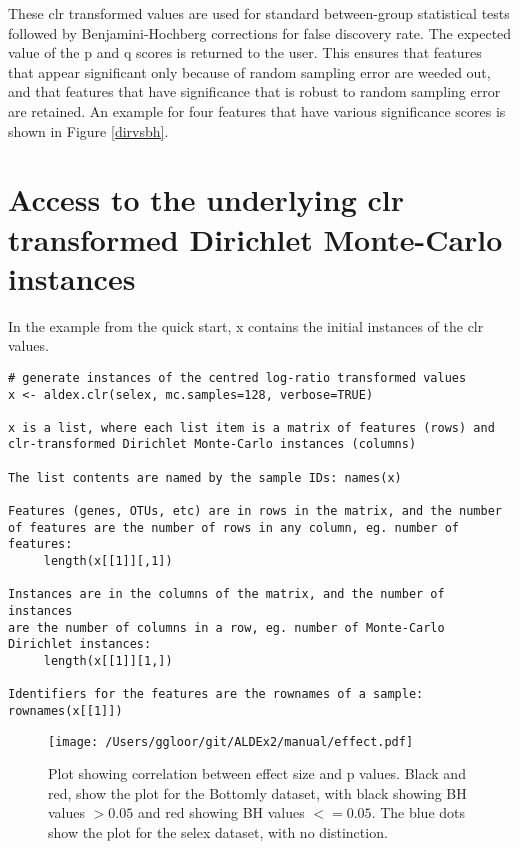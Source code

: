 \documentclass[11pt]{article}
\begin{document}
These clr transformed values are used for standard between-group statistical tests  followed by Benjamini-Hochberg corrections for false discovery rate. The expected value of the p and q scores is returned to the user. This ensures that features that appear significant only because of random sampling error are weeded out, and that features that have significance that is robust to random sampling error are retained. An example for four features that have various significance scores is shown in Figure \ref{dirvsbh}. 

\section{Access to the underlying clr transformed Dirichlet Monte-Carlo instances}{\label{clr}
In the example from the quick start, x contains the initial instances of the clr values. 
\begin{verbatim}
# generate instances of the centred log-ratio transformed values
x <- aldex.clr(selex, mc.samples=128, verbose=TRUE)  

x is a list, where each list item is a matrix of features (rows) and 
clr-transformed Dirichlet Monte-Carlo instances (columns)

The list contents are named by the sample IDs: names(x)

Features (genes, OTUs, etc) are in rows in the matrix, and the number 
of features are the number of rows in any column, eg. number of features: 
     length(x[[1]][,1])
     
Instances are in the columns of the matrix, and the number of instances
are the number of columns in a row, eg. number of Monte-Carlo Dirichlet instances: 
     length(x[[1]][1,])
     
Identifiers for the features are the rownames of a sample: rownames(x[[1]])

\end{verbatim}

\newpage
\begin{wrapfigure}{R}[0mm]{0.4\textwidth}
\vspace{0cm}
\begin{center}
\texttt{[image: /Users/ggloor/git/ALDEx2/manual/effect.pdf]}
\caption{Plot showing correlation between effect size and p values. Black and red, show the plot for the Bottomly dataset, with black showing BH values $>0.05$ and red showing BH values $<= 0.05$. The blue dots show the plot for the selex dataset, with no distinction.}
\label{effect}
\end{center}\vspace{0cm}
\end{wrapfigure}

}
\end{document}
